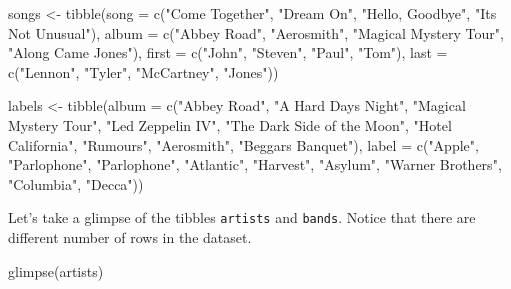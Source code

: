\documentclass[
]{book}
\newenvironment{Shaded}{\begin{snugshade}}{\end{snugshade}}
\newcommand{\AttributeTok}[1]{\textcolor[rgb]{0.77,0.63,0.00}{#1}}
\newcommand{\FunctionTok}[1]{\textcolor[rgb]{0.00,0.00,0.00}{#1}}
\newcommand{\NormalTok}[1]{#1}
\newcommand{\OtherTok}[1]{\textcolor[rgb]{0.56,0.35,0.01}{#1}}
\newcommand{\StringTok}[1]{\textcolor[rgb]{0.31,0.60,0.02}{#1}}
\begin{document}
\begin{Shaded}
\begin{Highlighting}[]
\NormalTok{songs }\OtherTok{\textless{}{-}} \FunctionTok{tibble}\NormalTok{(}\AttributeTok{song =} \FunctionTok{c}\NormalTok{(}\StringTok{"Come Together"}\NormalTok{, }\StringTok{"Dream On"}\NormalTok{, }\StringTok{"Hello, Goodbye"}\NormalTok{, }\StringTok{"It\textquotesingle{}s Not Unusual"}\NormalTok{),}
                \AttributeTok{album  =} \FunctionTok{c}\NormalTok{(}\StringTok{"Abbey Road"}\NormalTok{, }\StringTok{"Aerosmith"}\NormalTok{, }\StringTok{"Magical Mystery Tour"}\NormalTok{, }\StringTok{"Along Came Jones"}\NormalTok{), }
                \AttributeTok{first =} \FunctionTok{c}\NormalTok{(}\StringTok{"John"}\NormalTok{, }\StringTok{"Steven"}\NormalTok{, }\StringTok{"Paul"}\NormalTok{, }\StringTok{"Tom"}\NormalTok{), }
                \AttributeTok{last =} \FunctionTok{c}\NormalTok{(}\StringTok{"Lennon"}\NormalTok{, }\StringTok{"Tyler"}\NormalTok{, }\StringTok{"McCartney"}\NormalTok{, }\StringTok{"Jones"}\NormalTok{))}


\NormalTok{labels }\OtherTok{\textless{}{-}} \FunctionTok{tibble}\NormalTok{(}\AttributeTok{album =} \FunctionTok{c}\NormalTok{(}\StringTok{"Abbey Road"}\NormalTok{, }\StringTok{"A Hard Days Night"}\NormalTok{, }\StringTok{"Magical Mystery Tour"}\NormalTok{,}
                           \StringTok{"Led Zeppelin IV"}\NormalTok{, }\StringTok{"The Dark Side of the Moon"}\NormalTok{, }\StringTok{"Hotel California"}\NormalTok{, }
                           \StringTok{"Rumours"}\NormalTok{, }\StringTok{"Aerosmith"}\NormalTok{, }\StringTok{"Beggar\textquotesingle{}s Banquet"}\NormalTok{), }
                 \AttributeTok{label =} \FunctionTok{c}\NormalTok{(}\StringTok{"Apple"}\NormalTok{, }\StringTok{"Parlophone"}\NormalTok{, }\StringTok{"Parlophone"}\NormalTok{, }\StringTok{"Atlantic"}\NormalTok{, }\StringTok{"Harvest"}\NormalTok{,}
                           \StringTok{"Asylum"}\NormalTok{, }\StringTok{"Warner Brothers"}\NormalTok{, }\StringTok{"Columbia"}\NormalTok{, }\StringTok{"Decca"}\NormalTok{))}
\end{Highlighting}
\end{Shaded}

Let's take a glimpse of the tibbles \texttt{artists} and \texttt{bands}. Notice that there are different number of rows in the dataset.

\begin{Shaded}
\begin{Highlighting}[]
\FunctionTok{glimpse}\NormalTok{(artists)}
\end{Highlighting}
\end{Shaded}
\end{document}
